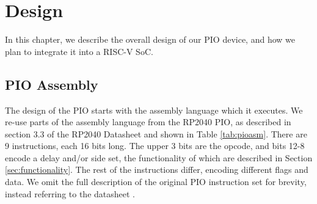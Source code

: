 \chapter{Design}
\label{ch:design}

In this chapter, we describe the overall design of our PIO device, and how we plan to integrate it into a RISC-V SoC.

\section{PIO Assembly}
\label{sec:pioasm}

The design of the PIO starts with the assembly language which it executes. We re-use parts of the assembly language from the RP2040 PIO, as described in section 3.3 of the RP2040 Datasheet and shown in Table \ref{tab:pioasm}. There are 9 instructions, each 16 bits long. The upper 3 bits are the opcode, and bits 12-8 encode a delay and/or side set, the functionality of which are described in Section \ref{sec:functionality}. The rest of the instructions differ, encoding different flags and data. We omit the full description of the original PIO instruction set for brevity, instead referring to the datasheet \cite{rp2040}.

